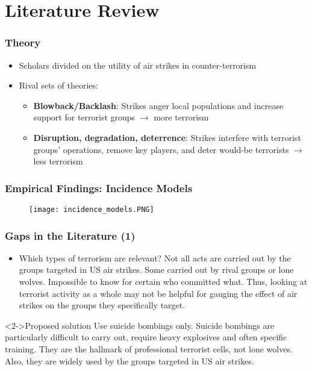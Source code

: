 \documentclass{beamer}
\begin{document}
\section{Literature Review}

  \begin{frame}
    \frametitle{Theory}
    \begin{itemize}
       \item Scholars divided on the utility of air strikes in counter-terrorism
	\item Rival sets of theories:
		\begin{itemize}
			\item \textbf{Blowback/Backlash}: Strikes anger local populations and increase support for terrorist groups $\rightarrow$ more terrorism
			\item \textbf{Disruption, degradation, deterrence}: Strikes interfere with terrorist groups' operations, remove key players, and deter would-be terrorists $\rightarrow$ less terrorism
		\end{itemize}
\end{itemize}
  \end{frame}

  \begin{frame}
    \frametitle{Empirical Findings: Incidence Models}
	\begin{figure}[h!]
		\texttt{[image: incidence\_models.PNG]}
	\end{figure}
  \end{frame}

 \begin{frame}
    \frametitle{Gaps in the Literature (1)}
	\begin{itemize}
		\item Which types of terrorism are relevant? Not all acts are carried out by the groups targeted in US air strikes. Some carried out by rival groups or lone wolves. Impossible to know for certain who committed what. Thus, looking at terrorist activity as a whole may not be helpful for gauging the effect of air strikes on the groups they specifically target.
	\end{itemize}
\vspace{3mm}
    \begin{alertblock}<2->{Proposed solution}
      Use suicide bombings only. Suicide bombings are particularly difficult to carry out, require heavy explosives and often specific training. They are the hallmark of professional terrorist cells, not lone wolves. Also, they are widely used by the groups targeted in US air strikes.
    \end{alertblock}
  \end{frame}
\end{document}
